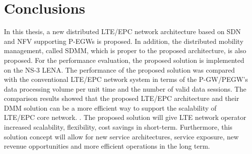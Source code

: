 \documentclass[runningheads,a4paper]{llncs}
\begin{document}
\section{Conclusions}


In this thesis, a new distributed LTE/EPC network architecture based on SDN and NFV supporting P-EGWs is proposed. In addition, the distributed mobility management, called SDMM, which is proper to the proposed architecture, is also proposed. For the performance evaluation, the proposed solution is implemented on the NS-3 LENA. The performance of the proposed solution was compared with the conventional LTE/EPC network system in terms of the P-GW/PEGW's data processing volume per unit time and the number of valid data sessions. The comparison results showed that the proposed LTE/EPC architecture and their DMM solution can be a more efficient way to support the scalability of LTE/EPC core network.
.
The proposed solution will give LTE network operator increased scalability, flexibility, cost savings in short-term. Furthermore, this solution concept will allow for new service architectures, service exposure, new revenue opportunities and more efficient operations in the long term.

\end{document}
